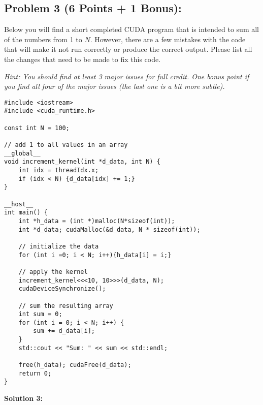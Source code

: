 \documentclass[]{article}
\begin{document}
\subsection*{Problem 3 (6 Points + 1 Bonus):}
Below you will find a short completed CUDA program that is intended to sum all of the numbers from 1 to $N$. However, there are a few mistakes with the code that will make it not run correctly or produce the correct output. Please list all the changes that need to be made to fix this code.

\textit{Hint: You should find at least 3 major issues for full credit. One bonus point if you find all four of the major issues (the last one is a bit more subtle).}

\begin{lstlisting}
#include <iostream>
#include <cuda_runtime.h>

const int N = 100;

// add 1 to all values in an array
__global__
void increment_kernel(int *d_data, int N) {
    int idx = threadIdx.x;
    if (idx < N) {d_data[idx] += 1;}
}

__host__
int main() {
    int *h_data = (int *)malloc(N*sizeof(int));
    int *d_data; cudaMalloc(&d_data, N * sizeof(int));

    // initialize the data
    for (int i =0; i < N; i++){h_data[i] = i;}

    // apply the kernel
    increment_kernel<<<10, 10>>>(d_data, N);
    cudaDeviceSynchronize();

    // sum the resulting array
    int sum = 0;
    for (int i = 0; i < N; i++) {
        sum += d_data[i];
    }
    std::cout << "Sum: " << sum << std::endl;

    free(h_data); cudaFree(d_data);
    return 0;
}
\end{lstlisting}

\clearpage
\textbf{Solution 3:}

\clearpage
\end{document}
